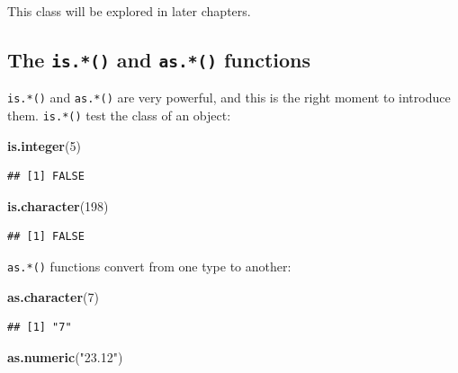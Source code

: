 \documentclass[]{gitbook}
\newenvironment{Shaded}{\begin{snugshade}}{\end{snugshade}}
\newcommand{\DecValTok}[1]{\textcolor[rgb]{0.00,0.00,0.81}{#1}}
\newcommand{\KeywordTok}[1]{\textcolor[rgb]{0.13,0.29,0.53}{\textbf{#1}}}
\newcommand{\NormalTok}[1]{#1}
\newcommand{\StringTok}[1]{\textcolor[rgb]{0.31,0.60,0.02}{#1}}
\theoremstyle{definition}
\theoremstyle{definition}
\theoremstyle{definition}
\theoremstyle{remark}
\begin{document}
This class will be explored in later chapters.

\hypertarget{the-is.-and-as.-functions}{%
\subsection{\texorpdfstring{The \texttt{is.*()} and \texttt{as.*()}
functions}{The is.*() and as.*() functions}}\label{the-is.-and-as.-functions}}

\texttt{is.*()} and \texttt{as.*()} are very powerful, and this is the
right moment to introduce them. \texttt{is.*()} test the class of an
object:

\begin{Shaded}
\begin{Highlighting}[]
\KeywordTok{is.integer}\NormalTok{(}\DecValTok{5}\NormalTok{)}
\end{Highlighting}
\end{Shaded}

\begin{verbatim}
## [1] FALSE
\end{verbatim}

\begin{Shaded}
\begin{Highlighting}[]
\KeywordTok{is.character}\NormalTok{(}\DecValTok{198}\NormalTok{)}
\end{Highlighting}
\end{Shaded}

\begin{verbatim}
## [1] FALSE
\end{verbatim}

\texttt{as.*()} functions convert from one type to another:

\begin{Shaded}
\begin{Highlighting}[]
\KeywordTok{as.character}\NormalTok{(}\DecValTok{7}\NormalTok{)}
\end{Highlighting}
\end{Shaded}

\begin{verbatim}
## [1] "7"
\end{verbatim}

\begin{Shaded}
\begin{Highlighting}[]
\KeywordTok{as.numeric}\NormalTok{(}\StringTok{"23.12"}\NormalTok{)}
\end{Highlighting}
\end{Shaded}
\end{document}
